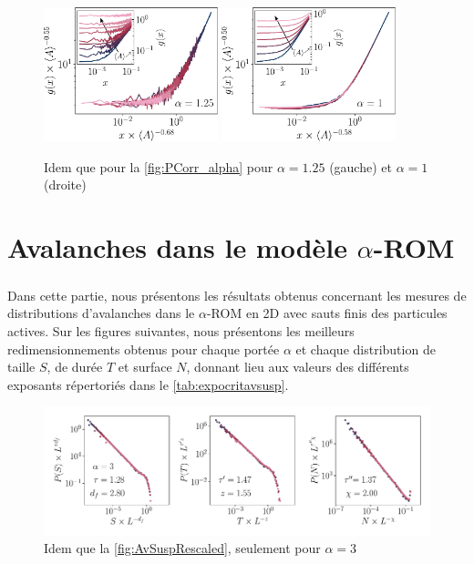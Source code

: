 \begin{figure}[h]
\centering
\includegraphics[width=0.45\textwidth]{Chapitre3/Figures/Interpretation/PCorr/PCorr_rescaled_alpha125_mean.pdf}
\includegraphics[width=0.45\textwidth]{Chapitre3/Figures/Interpretation/PCorr/PCorr_rescaled_alpha1_mean.pdf}
\caption{Idem que pour la \autoref{fig:PCorr_alpha} pour $\alpha = 1.25$ (gauche) et $\alpha = 1$ (droite)}
\label{fig:PCorrAnnexe5}
\end{figure}

\FloatBarrier

\section{Avalanches dans le modèle $\alpha$-ROM}

\label{sec:AvTBLRRAnnexe}

\subparagraph{}Dans cette partie, nous présentons les résultats obtenus concernant les mesures de distributions d'avalanches dans le $\alpha$-ROM en 2D avec sauts finis des particules actives. Sur les figures suivantes, nous présentons les meilleurs redimensionnements obtenus pour chaque portée $\alpha$ et chaque distribution de taille $S$, de durée $T$ et surface $N$, donnant lieu aux valeurs des différents exposants répertoriés dans le \autoref{tab:expocritavsusp}.

\begin{figure}[h]
\centering
\includegraphics[width=\textwidth]{Chapitre3/Figures/Avalanches/Rescale_Av_alpha3.pdf}
\caption{Idem que la \autoref{fig:AvSuspRescaled}, seulement pour $\alpha=3$}
	\label{fig:annexAv1}
\end{figure}

